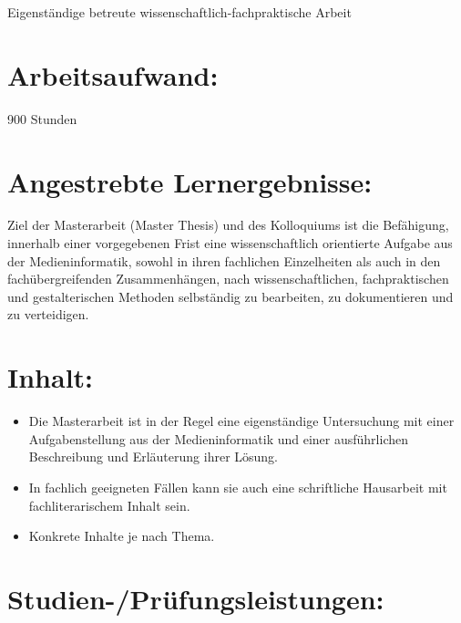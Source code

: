 Eigenständige betreute wissenschaftlich-fachpraktische Arbeit

\section*{Arbeitsaufwand:\label{/mi-2017/modulbeschreibungen-master/MA_All_Modul_Masterarbeit}}\label{arbeitsaufwandpathlabelmi-2017modulbeschreibungen-mastermaux5fallux5fmodulux5fmasterarbeit}

900 Stunden

\section*{Angestrebte
Lernergebnisse:\label{/mi-2017/modulbeschreibungen-master/MA_All_Modul_Masterarbeit}}\label{angestrebte-lernergebnissepathlabelmi-2017modulbeschreibungen-mastermaux5fallux5fmodulux5fmasterarbeit}

Ziel der Masterarbeit (Master Thesis) und des Kolloquiums ist die
Befähigung, innerhalb einer vorgegebenen Frist eine wissenschaftlich
orientierte Aufgabe aus der Medieninformatik, sowohl in ihren fachlichen
Einzelheiten als auch in den fachübergreifenden Zusammenhängen, nach
wissenschaftlichen, fachpraktischen und gestalterischen Methoden
selbständig zu bearbeiten, zu dokumentieren und zu verteidigen.

\section*{Inhalt:\label{/mi-2017/modulbeschreibungen-master/MA_All_Modul_Masterarbeit}}\label{inhaltpathlabelmi-2017modulbeschreibungen-mastermaux5fallux5fmodulux5fmasterarbeit}

\begin{itemize}
\tightlist
\item
  Die Masterarbeit ist in der Regel eine eigenständige Untersuchung mit
  einer Aufgabenstellung aus der Medieninformatik und einer
  ausführlichen Beschreibung und Erläuterung ihrer Lösung.
\item
  In fachlich geeigneten Fällen kann sie auch eine schriftliche
  Hausarbeit mit fachliterarischem Inhalt sein.
\item
  Konkrete Inhalte je nach Thema.
\end{itemize}

\section*{Studien-/Prüfungsleistungen:\label{/mi-2017/modulbeschreibungen-master/MA_All_Modul_Masterarbeit}}\label{studien-pruxfcfungsleistungenpathlabelmi-2017modulbeschreibungen-mastermaux5fallux5fmodulux5fmasterarbeit}

